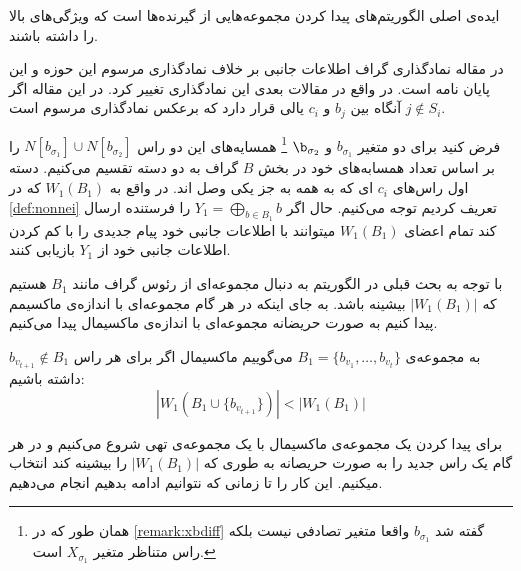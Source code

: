 ایده‌ی اصلی الگوریتم‌های
 پیدا کردن مجموعه‌هایی از گیرنده‌ها است که ویژگی‌های بالا را داشته باشند.
 
 \begin{remark}
 	در مقاله
 	\cite{pliablefirstpaper}
 	نمادگذاری گراف اطلاعات جانبی بر خلاف نمادگذاری مرسوم این حوزه و این پایان نامه است. در واقع در مقالات بعدی این نمادگذاری تغییر کرد. در این مقاله اگر
 	$j \notin S_i$
 	آنگاه بین
 	$b_j$
 	و
 	$c_i$
 	یالی قرار دارد که برعکس نمادگذاری مرسوم است.
 \end{remark}
 
 فرض کنید برای دو متغیر
 $b_{\sigma_1}$
 و
 $\b_{\sigma_2}$
 \footnote{
 همان طور که در
 \autoref{remark:xbdiff}
 گفته شد 
 $b_{\sigma_1}$
 واقعا متغیر تصادفی نیست بلکه راس متناظر متغیر
 $X_{\sigma_1}$
 است.
 }
 همسایه‌های این دو راس
 $N[b_{\sigma_1}] \cup N[b_{\sigma_2}]$
 را بر اساس تعداد همسابه‌های خود در بخش
 $B$
 گراف به دو دسته تقسیم می‌کنیم. دسته اول راس‌های
 $c_i$
 ای که به همه به جز یکی وصل اند. در واقع به
 $W_1(B_1)$
 که در
 \autoref{def:nonnei}
 تعریف کردیم توجه می‌کنیم.  حال اگر
  $Y_1 = \bigoplus\limits_{b \in B_1} b$
  را فرستنده ارسال کند تمام اعضای
  $W_1(B_1)$
  میتوانند با اطلاعات جانبی خود پیام جدیدی را با کم کردن اطلاعات جانبی خود از
  $Y_1$
  بازیابی کنند.
  
 با توجه به بحث قبلی در الگوریتم
\GRCOVone
به دنبال مجموعه‌ای از رئوس گراف مانند
$B_1$
هستیم که 
$|W_1(B_1)|$
بیشینه باشد. به جای اینکه در هر گام مجموعه‌ای با اندازه‌ی ماکسیمم پیدا کنیم به صورت حریضانه مجموعه‌ای با اندازه‌ی ماکسیمال پیدا می‌کنیم.

به مجموعه‌ی 
$B_1 = \{b_{v_1}, \ldots, b_{v_t}\}$
می‌گوییم ماکسیمال اگر برای هر راس
$b_{v_{t  +1}} \notin B_1$
داشته باشیم:
\begin{equation}
	\tag{شرط ماکسیمال بودن}
	|W_1(B_1 \cup \{b_{v_{t + 1}} \})| < |W_1(B_1)|
\end{equation}

برای پیدا کردن یک مجموعه‌ی ماکسیمال با یک مجموعه‌ی تهی شروع می‌کنیم و در هر گام یک راس جدید را به صورت حریصانه به طوری که 
$|W_1(B_1)|$
را بیشینه کند انتخاب میکنیم. این کار را تا زمانی که نتوانیم ادامه بدهیم انجام می‌دهیم.

